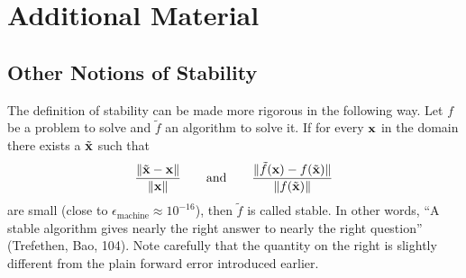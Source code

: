 
\newpage

\section*{Additional Material} %

\subsection*{Other Notions of Stability} %

The definition of stability can be made more rigorous in the following way.
Let $f$ be a problem to solve and $\tilde{f}$ an algorithm to solve it.
If for every $\mathbf{x}$ in the domain there exists a $\tilde{\mathbf{x}}$ such that
\[
\frac{\|\tilde{\mathbf{x}} - \mathbf{x}\|}{\|\mathbf{x}\|}
\qquad\text{and}\qquad
\frac{\|\tilde{f}(\mathbf{x}) - f(\tilde{\mathbf{x}})\|}{\|f(\tilde{\mathbf{x}})\|}
\]
are small (close to $\epsilon_{\text{machine}} \approx 10^{-16}$), then $\tilde{f}$ is called stable.
In other words, ``A stable algorithm gives nearly the right answer to nearly the right question'' (Trefethen, Bao, 104).
Note carefully that the quantity on the right is slightly different from the plain forward error introduced earlier.


